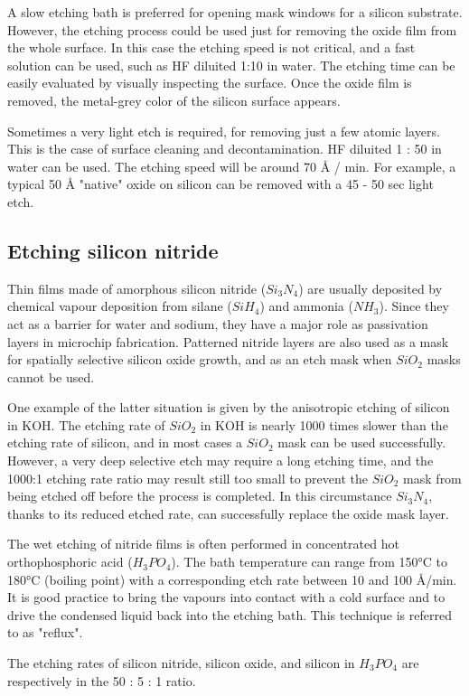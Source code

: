 A slow etching bath is preferred for opening mask windows for a silicon substrate.
However, the etching process could be used just for removing the oxide film from the whole surface.
In this case the etching speed is not critical, and a fast solution can be used, such as HF diluited 1:10 in water.
The etching time can be easily evaluated by visually inspecting the surface.
Once the oxide film is removed, the metal-grey color of the silicon surface appears.

Sometimes a very light etch is required, for removing just a few atomic layers.
This is the case of surface cleaning and decontamination. HF diluited 1 : 50 in water can be used.
The etching speed will be around 70 Å / min. For example, a typical 50 Å "native" oxide on silicon can be removed with a 45 - 50 sec light etch.

\newpage

\subsection{Etching silicon nitride}
Thin films made of amorphous silicon nitride ($Si_3N_4$) are usually deposited by chemical vapour deposition from silane ($SiH_4$) and ammonia ($NH_3$).
Since they act as a barrier for water and sodium, they have a major role as passivation layers in microchip fabrication.
Patterned nitride layers are also used as a mask for spatially selective silicon oxide growth, and as an etch mask when $SiO_2$ masks cannot be used.

One example of the latter situation is given by the anisotropic etching of silicon in KOH.
The etching rate of $SiO_2$ in KOH is nearly 1000 times slower than the etching rate of silicon, and in most cases a $SiO_2$ mask can be used successfully.
However, a very deep selective etch may require a long etching time, and the 1000:1 etching rate ratio may result still too small to prevent the $SiO_2$ mask from being etched off before the process is completed.
In this circumstance $Si_3N_4$, thanks to its reduced etched rate, can successfully replace the oxide mask layer.

The wet etching of nitride films is often performed in concentrated hot orthophosphoric acid ($H_3PO_4$).
The bath temperature can range from 150°C to 180°C (boiling point) with a corresponding etch rate between 10 and 100 Å/min.
It is good practice to bring the vapours into contact with a cold surface and to drive the condensed liquid back into the etching bath.
This technique is referred to as "reflux".

The etching rates of silicon nitride, silicon oxide, and silicon in $H_3PO_4$ are respectively in the 50 : 5 : 1 ratio.